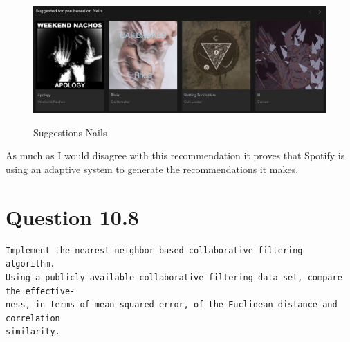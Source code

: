 \documentclass[11pt]{article}
\begin{document}
\begin{figure}[H]
\centering
{\includegraphics[scale=.5]{simToNails.png}}
   \caption{Suggestions Nails}
          \label{fig:q2_snails}
\end{figure}
\noindent As much as I would disagree with this recommendation it proves that Spotify is using an adaptive system to generate the recommendations it makes.
\clearpage
\section{Question 10.8} \label{q3}
\begin{verbatim}
Implement the nearest neighbor based collaborative filtering algorithm.
Using a publicly available collaborative filtering data set, compare the effective-
ness, in terms of mean squared error, of the Euclidean distance and correlation
similarity.
\end{verbatim}
\end{document}
